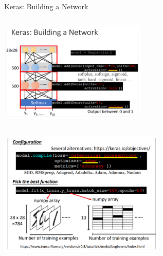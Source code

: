 \documentclass[aspectratio=169,14pt,usenames,dvipsnames]{beamer}
\begin{document}
\begin{frame}{Keras: Building a Network}
\centering

\includegraphics[width=7cm, height=5.5cm]{Keras_Images/Ker_7.png}
\end{frame}

\begin{frame}
\centering

\includegraphics[width=8cm, height=6cm]{Keras_Images/Ker_8.png}
\end{frame}
\end{document}
